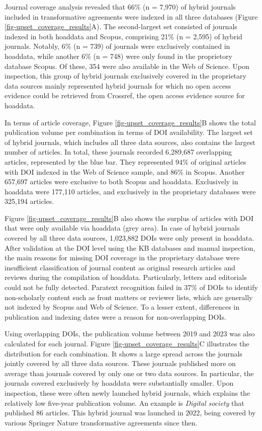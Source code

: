 \documentclass[a4paper,man,floatsintext,longtable,noextraspace,10pt]{apa6}
\begin{document}
Journal coverage analysis revealed that 66\% (n = 7,970) of hybrid
journals included in transformative agreements were indexed in all three
databases (Figure \ref{fig-upset_coverage_results}A). The second-largest
set consisted of journals indexed in both hoaddata and Scopus,
comprising 21\% (n = 2,595) of hybrid journals. Notably, 6\% (n = 739)
of journals were exclusively contained in hoaddata, while another 6\% (n
= 748) were only found in the proprietory database Scopus. Of these, 354
were also available in the Web of Science. Upon inspection, this group
of hybrid journals exclusively covered in the proprietary data sources
mainly represented hybrid journals for which no open access evidence
could be retrieved from Crossref, the open access evidence source for
hoaddata.

In terms of article coverage, Figure \ref{fig-upset_coverage_results}B
shows the total publication volume per combination in terms of DOI
availability. The largest set of hybrid journals, which includes all
three data sources, also contains the largest number of articles. In
total, these journals recorded 6,289,687 overlapping articles,
represented by the blue bar. They represented 94\% of original articles
with DOI indexed in the Web of Science sample, and 86\% in Scopus.
Another 657,697 articles were exclusive to both Scopus and hoaddata.
Exclusively in hoaddata were 177,110 articles, and exclusively in the
proprietary databases were 325,194 articles.

Figure \ref{fig-upset_coverage_results}B also shows the surplus of
articles with DOI that were only available via hoaddata (grey area). In
case of hybrid journals covered by all three data sources, 1,023,882
DOIs were only present in hoaddata. After validation at the DOI level
using the KB databases and manual inspection, the main reasons for
missing DOI coverage in the proprietary database were insufficient
classification of journal content as original research articles and
reviews during the compilation of hoaddata. Particularly, letters and
editorials could not be fully detected. Paratext recognition failed in
37\% of DOIs to identify non-scholarly content such as front matters or
reviewer lists, which are generally not indexed by Scopus and Web of
Science. To a lesser extent, differences in publication and indexing
dates were a reason for non-overlapping DOIs.

Using overlapping DOIs, the publication volume between 2019 and 2023 was
also calculated for each journal. Figure
\ref{fig-upset_coverage_results}C illustrates the distribution for each
combination. It shows a large spread across the journals jointly covered
by all three data sources. These journals published more on average than
journals covered by only one or two data sources. In particular, the
journals covered exclusively by hoaddata were substantially smaller.
Upon inspection, these were often newly launched hybrid journals, which
explains the relatively low five-year publication volume. An example is
\emph{Digital society} that published 86 articles. This hybrid journal
was launched in 2022, being covered by various Springer Nature
transformative agreements since then.
\end{document}
